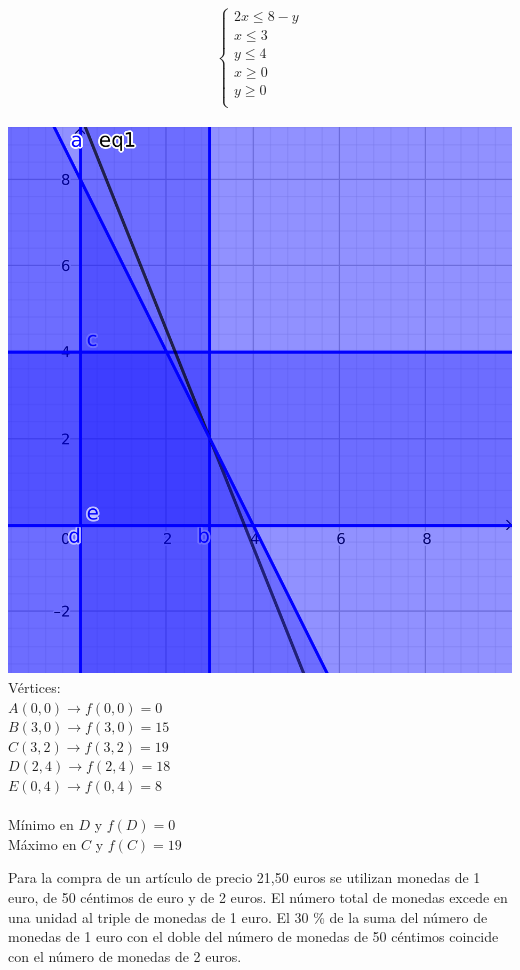 \documentclass[addpoints,spanish, 12pt,a4paper]{exam}
\begin{document}
\begin{questions}
\begin{parts}
\end{parts}
\begin{solution}
$$\left\{\begin{matrix}
2x  \leqslant  8 - y\\
x  \leqslant  3\\
y  \leqslant  4\\
x  \geqslant  0 \\
y  \geqslant  0 \\
\end{matrix}\right.$$ 
\\
\includegraphics[scale=0.6]{fi1_1} 
\\Vértices:\\
$A(0 , 0) \to f(0,0)=0$\\
$B(3 , 0) \to f(3,0)=15$\\
$C(3 , 2) \to f(3,2)=19$\\
$D(2 , 4) \to f(2,4)=18$\\
$E(0 , 4) \to f(0,4)=8$\\
\\
Mínimo en $D$ y $f(D)=0$ \\
Máximo en $C$ y $f(C)=19$
\end{solution}

\question Para la compra de un artículo de precio 21,50 euros se utilizan monedas de 1 euro, de 50 céntimos de euro y
de 2 euros. El número total de monedas excede en una unidad al triple de monedas de 1 euro. El 30
\% de la suma del número de monedas de 1 euro con el doble del número de monedas de 50 céntimos coincide
con el número de monedas de 2 euros.
\begin{parts}

\end{parts}
\end{questions}
\end{document}

